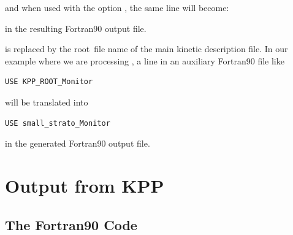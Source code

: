 \documentclass[twoside]{article}
\newcommand{\kpproot}{{\sc root}}
\begin{document}

and when used with the option  , the same
line will become:


in the resulting Fortran90 output file.

 is replaced by the \kpproot\ file name of the main
kinetic description file. In our example where we are processing
, a line in an auxiliary Fortran90 file like
%
\begin{verbatim}
USE KPP_ROOT_Monitor
\end{verbatim}
%
will be translated into
%
\begin{verbatim}
USE small_strato_Monitor
\end{verbatim}
%
in the generated Fortran90 output file.

\section{Output from KPP}
\label{sec:output}

\subsection{The Fortran90 Code}
\end{document}
